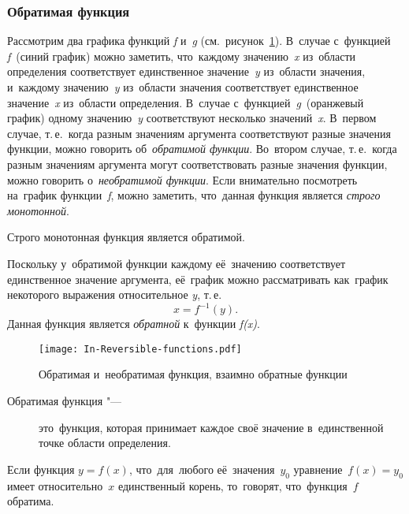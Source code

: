 \documentclass[]{scrartcl}
\begin{document}
{{\subsubsection{Обратимая функция}
Рассмотрим два графика функций \textit{f} и~\textit{g} (см.~рисунок~\ref{fig:In-Reversible-functions}). В~случае с~функцией \textit{f}~(синий график) можно заметить, что~каждому значению~\textit{x} из~области определения соответствует единственное значение~\textit{y} из~области значения, и~каждому значению~\textit{y} из~области значения соответствует единственное значение~\textit{x} из~области определения. В~случае с~функцией~\textit{g}~(оранжевый график)  одному значению~\textit{y} соответствуют несколько значений~\textit{x}. В~первом случае, т.\,е.~когда разным значениям аргумента соответствуют разные значения функции, можно говорить об~\emph{обратимой функции}. Во~втором случае, т.\,е.~когда разным значениям аргумента могут соответствовать разные значения функции, можно говорить о~\emph{необратимой функции}. Если внимательно посмотреть на~график функции~\textit{f}, можно заметить, что~данная функция является \emph{строго монотонной}.
\begin{proposition}
	Строго монотонная функция является обратимой.
\end{proposition}
Поскольку у~обратимой функции каждому её~значению соответствует единственное значение аргумента, её~график можно рассматривать как~график некоторого выражения относительное \textit{y}, т.\,е.
\begin{equation}\label{eq:reversible-function}
x=f^{-1}(y).
\end{equation}
Данная функция является \emph{обратной} к~функции \textit{f(x)}.

\begin{figure}[ht]
	\centering %
	\texttt{[image: In-Reversible-functions.pdf]}
	\caption{Обратимая и~необратимая функция, взаимно обратные функции}\label{fig:In-Reversible-functions}
\end{figure}

\begin{description}
	\item[Обратимая функция "---] это~функция, которая принимает каждое своё значение в~единственной точке области определения.
\end{description}
Если функция ${\displaystyle y=f(x)}$, что~для~любого её~значения~${\displaystyle y_{0}}$ уравнение~${\displaystyle f(x)=y_{0}}$ имеет относительно~${\displaystyle x}$ единственный корень, то~говорят, что~функция~${\displaystyle f}$ обратима.

}}
\end{document}
